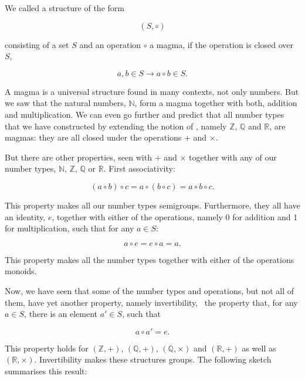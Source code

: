 \documentclass[tikz]{scrreprt}
\begin{document}
We called a structure of the form

\[
(S,\circ)
\]

consisting of a set $S$
and an operation $\circ$ a magma,
if the operation is closed over $S$,
\ie\

\[
a,b \in S \rightarrow a\circ b \in S.
\]

A magma is a universal structure found
in many contexts, not only numbers. But
we saw that the natural numbers, $\mathbb{N}$, 
form a magma together with both, addition
and multiplication. We can even go further
and predict that all number types that
we have constructed by extending the notion
of , namely
$\mathbb{Z}$,
$\mathbb{Q}$ and
$\mathbb{R}$,
are magmas: they
are all closed under the operations $+$ and
$\times$. 

But there are other properties,
seen with $+$ and $\times$ together 
with any of our number types,
$\mathbb{N}$,
$\mathbb{Z}$,
$\mathbb{Q}$ or
$\mathbb{R}$.
First associativity:

\[
(a\circ b) \circ c = a\circ (b\circ c) = a \circ b \circ c.
\]

This property makes all our number types semigroups.
Furthermore, they all have an identity, $e$, together with
either of the operations, namely 0 for addition and 1
for multiplication, such that for any $a \in S$:

\[
a \circ e = e \circ a = a.
\]

This property makes all the number types together with
either of the operations monoids.

Now, we have seen that some of the number types and operations,
but not all of them,
have yet another property, namely invertibility, \ie\
the property that, for any $a \in S$, there is an element
$a' \in S$, such that

\[
a \circ a' = e.
\]

This property holds for 
$(\mathbb{Z},+)$, 
$(\mathbb{Q},+)$, $(\mathbb{Q},\times)$ and
$(\mathbb{R},+)$ as well as
$(\mathbb{R},\times)$.
Invertibility makes these structures groups.
The following sketch summarises this result:
\end{document}
